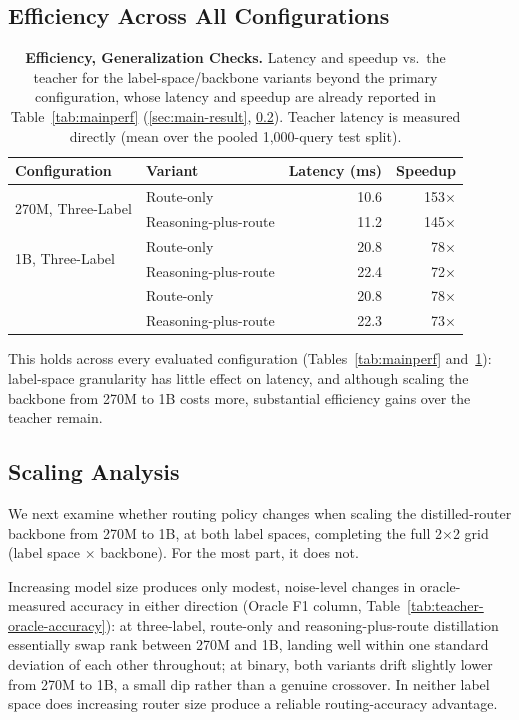 \documentclass{article}
\begin{document}
\subsection{Efficiency Across All Configurations}
\label{sec:efficiency-appendix}

\begin{table}[h]
\centering
\caption{\textbf{Efficiency, Generalization Checks.} Latency and
speedup vs.\ the teacher for the label-space/backbone variants beyond
the primary configuration, whose latency and speedup are already
reported in Table~\ref{tab:mainperf}
(\ref{sec:main-result}, \ref{sec:effect-of-scale}). Teacher
latency is measured directly (mean over the pooled 1,000-query
test split).}
\label{tab:efficiency}
\begin{tabular}{@{}llrr@{}}
\toprule
Configuration & Variant & Latency (ms) & Speedup \\
\midrule
\multirow{2}{*}{270M, Three-Label} & Route-only & 10.6 & 153× \\
 & Reasoning-plus-route & 11.2 & 145× \\
\midrule
\multirow{2}{*}{1B, Three-Label} & Route-only & 20.8 & 78× \\
 & Reasoning-plus-route & 22.4 & 72× \\
\addlinespace
\multirow{2}{*}{1B, Binary} & Route-only & 20.8 & 78× \\
 & Reasoning-plus-route & 22.3 & 73× \\
\bottomrule
\end{tabular}
\end{table}

This holds across every evaluated configuration (Tables~\ref{tab:mainperf}
and~\ref{tab:efficiency}): label-space granularity has little effect on
latency, and although scaling the backbone from 270M to 1B costs more,
substantial efficiency gains over the teacher remain.

\subsection{Scaling Analysis}
\label{sec:effect-of-scale}
\label{sec:fidelity-oracle-1b}
\label{sec:binary-ablation}
\label{sec:label-space-granularity}

We next examine whether routing policy changes when scaling the
distilled-router backbone from 270M to 1B, at both label spaces,
completing the full 2×2 grid (label space $\times$ backbone). For the
most part, it does not.

Increasing model size produces only modest, noise-level changes in
oracle-measured accuracy in either direction (Oracle F1 column,
Table~\ref{tab:teacher-oracle-accuracy}): at three-label, route-only and
reasoning-plus-route distillation essentially swap rank between 270M
and 1B, landing well within one standard deviation of each other
throughout; at binary, both variants drift slightly lower from 270M to
1B, a small dip rather than a genuine crossover. In neither label
space does increasing router size produce a reliable routing-accuracy
advantage.
\end{document}
